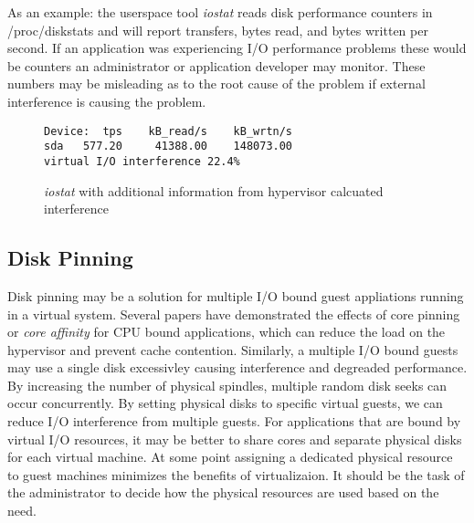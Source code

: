 As an example: the userspace tool \emph{iostat} reads disk performance counters in /proc/diskstats and will report transfers, bytes read, and bytes written per second.  If an application was experiencing I/O performance problems these would be counters an administrator or application developer may monitor.  These numbers may be misleading as to the root cause of the problem if external interference is causing the problem.  
\begin{figure}
\begin{Verbatim}
Device:  tps    kB_read/s    kB_wrtn/s
sda   577.20     41388.00    148073.00
virtual I/O interference 22.4%     
\end{Verbatim}
\label{fig:iostat}
\caption{\emph{iostat} with additional information from hypervisor calcuated interference}
\end{figure}

\subsection{Disk Pinning}
Disk pinning may be a solution for multiple I/O bound guest appliations running in a virtual system.  Several papers have demonstrated the effects of core pinning or \emph{core affinity} for CPU bound applications, which can reduce the load on the hypervisor and prevent cache contention.  Similarly, a multiple I/O bound guests may use a single disk excessivley causing interference and degreaded performance.  By increasing the number of physical spindles, multiple random disk seeks can occur concurrently.  By setting physical disks to specific virtual guests, we can reduce I/O interference from multiple guests.  For applications that are bound by virtual I/O resources, it may be better to share cores and separate physical disks for each virtual machine.  At some point assigning a dedicated physical resource to guest machines minimizes the benefits of virtualizaion.  It should be the task of the administrator to decide how the physical resources are used based on the need.
